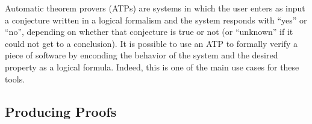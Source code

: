 \documentclass[a4paper, 12pt]{article}
\begin{document}

Automatic theorem provers (ATPs) are systems in which the user enters as input a conjecture written in
a logical
formalism and the system responds with ``yes'' or ``no'', depending on whether that conjecture is true or
not (or ``unknown'' if it could not get to a conclusion).
It is possible to use an ATP to formally verify a piece of software by enconding the behavior of the system
and the desired property as a logical formula. Indeed, this is one of the main use cases for these tools.

\subsection{Producing Proofs}
\end{document}
